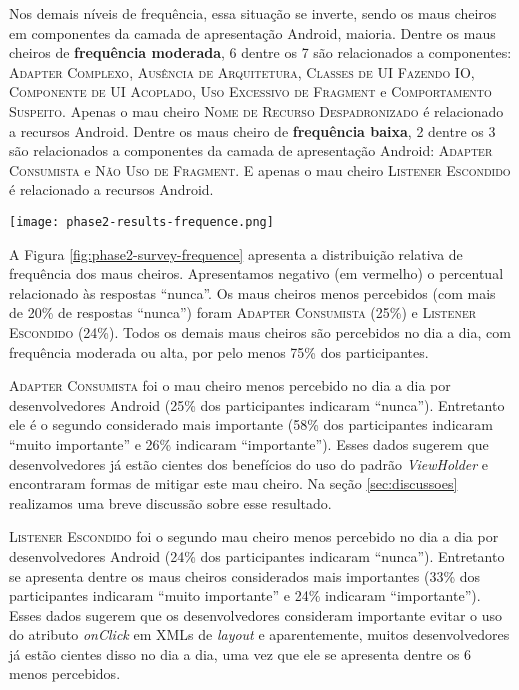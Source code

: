 Nos demais níveis de frequência, essa situação se inverte, sendo os maus cheiros em componentes da camada de apresentação Android, maioria. Dentre os maus cheiros de \textbf{\small frequência moderada}, 6 dentre os 7 são relacionados a componentes: \textsc{\small Adapter Complexo}, \textsc{\small Ausência de Arquitetura}, \textsc{\small Classes de UI Fazendo IO}, \textsc{\small Componente de UI Acoplado}, \textsc{\small Uso Excessivo de Fragment} e \textsc{\small Comportamento Suspeito}. Apenas o mau cheiro \textsc{\small Nome de Recurso Despadronizado} é relacionado a recursos Android. Dentre os maus cheiro de \textbf{\small frequência baixa}, 2 dentre os 3 são relacionados a componentes da camada de apresentação Android: \textsc{\small Adapter Consumista} e \textsc{\small Não Uso de Fragment}. E apenas o mau cheiro \textsc{\small Listener Escondido} é relacionado a recursos Android.

\begin{figure*}[!htb]
  \centering
  \texttt{[image: phase2-results-frequence.png]}
  \caption{Distribuição relativa de frequência dos maus cheiros propostos.}
  \label{fig:phase2-survey-frequence}
\end{figure*}

A Figura \ref{fig:phase2-survey-frequence} apresenta a distribuição relativa de frequência dos maus cheiros. Apresentamos negativo (em vermelho) o percentual relacionado às respostas ``nunca''. Os maus cheiros menos percebidos (com mais de 20\% de respostas ``nunca'') foram \textsc{\small Adapter Consumista} (25\%) e \textsc{\small Listener Escondido} (24\%). Todos os demais maus cheiros são percebidos no dia a dia, com frequência moderada ou alta, por pelo menos 75\% dos participantes.

\textsc{\small Adapter Consumista} foi o mau cheiro menos percebido no dia a dia por desenvolvedores Android (25\% dos participantes indicaram ``nunca''). Entretanto ele é o segundo considerado mais importante (58\% dos participantes indicaram ``muito importante'' e 26\% indicaram ``importante''). Esses dados sugerem que desenvolvedores já estão cientes dos benefícios do uso do padrão \textit{ViewHolder} \cite{AluraViewHolder} e encontraram formas de mitigar este mau cheiro. Na seção \ref{sec:discussoes} realizamos uma breve discussão sobre esse resultado.

\textsc{\small Listener Escondido} foi o segundo mau cheiro menos percebido no dia a dia por desenvolvedores Android (24\% dos participantes indicaram ``nunca''). Entretanto se apresenta dentre os maus cheiros considerados mais importantes (33\% dos participantes indicaram ``muito importante'' e 24\% indicaram ``importante''). Esses dados sugerem que os desenvolvedores consideram importante evitar o uso do atributo \textit{onClick} em XMLs de \textit{layout} e aparentemente, muitos desenvolvedores já estão cientes disso no dia a dia, uma vez que ele se apresenta dentre os 6 menos percebidos. \\


